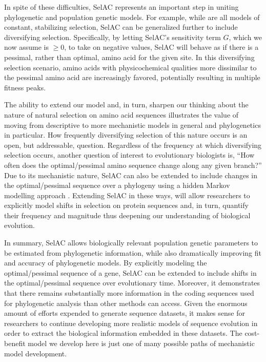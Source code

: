 \documentclass[onecolumn,letterpaper,fleqn,nogrid]{myMBE}%
\newcommand{\PC}{physicochemical\xspace}
\newcommand{\selac}{SelAC\xspace}
\begin{document}
In spite of these difficulties, \selac represents an important step in uniting phylogenetic and population genetic models.
For example, while \citet{KoshiEtAl1999,DimmicEtAl2000,KoshiAndGoldstein2001,RobinsonEtAl2003,LartillotAndPhilippe2004,ThorneEtAl2012,RodrigueAndLartillot2014} are all models of constant, stabilizing selection, \selac can be generalized further to include diversifying selection.
Specifically, by letting \selac's sensitivity term $G$, which we now assume is $\ge 0$, to take on negative values, \selac will behave as if there is a pessimal, rather than optimal, amino acid for the given site.
In this diversifying selection scenario, amino acids with \PC qualities more dissimilar to the pessimal amino acid are increasingly favored, potentially resulting in multiple fitness peaks.


The ability to extend our model and, in turn, sharpen our thinking about the nature of natural selection on amino acid sequences illustrates the value of moving from descriptive to more mechanistic models in general and phylogenetics in particular.
How frequently diversifying selection of this nature occurs is an open, but addressable, question.
Regardless of the frequency at which diversifying selection occurs, another question of interest to evolutionary biologists is, ``How often does the optimal/pessimal amino sequence change along any given branch?''
Due to its mechanistic nature, \selac can also be extended to include changes in the optimal/pessimal sequence over a phylogeny using a hidden Markov modelling approach \citet{TuffleySteel1998,Pennyetal2001,Whelan2008}.
Extending \selac in these ways, will allow researchers to explicitly model shifts in selection on protein sequences and, in turn, quantify their frequency and magnitude thus deepening our understanding of biological evolution.


In summary, \selac allows biologically relevant population genetic parameters to be estimated from phylogenetic information, while also dramatically improving fit and accuracy of phylogenetic models.
By explicitly modeling the optimal/pessimal sequence of a gene, \selac can be extended to include shifts in the optimal/pessimal sequence over evolutionary time.
Moreover, it demonstrates that there remains substantially more information in the coding sequences used for phylogenetic analysis than other methods can access.
Given the enormous amount of efforts expended to generate sequence datasets, it makes sense for researchers to continue developing more realistic models of sequence evolution in order to extract the biological information embedded in these datasets.
The cost-benefit model we develop here is just one of many possible paths of mechanistic model development.
\end{document}
